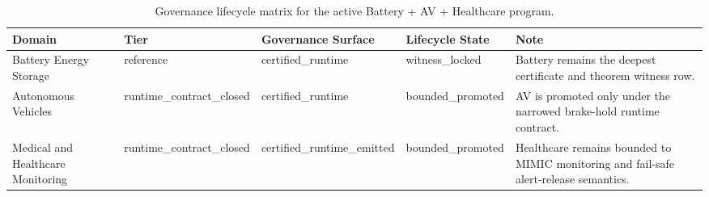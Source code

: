 \begin{table}[htbp]
\centering
\caption{Governance lifecycle matrix for the active Battery + AV + Healthcare program.}
\label{tbl:orius-governance-lifecycle-matrix}
\begin{tabular}{lllll}
\toprule
Domain & Tier & Governance Surface & Lifecycle State & Note\\
\midrule
Battery Energy Storage & reference & certified\_runtime & witness\_locked & Battery remains the deepest certificate and theorem witness row.\\
Autonomous Vehicles & runtime\_contract\_closed & certified\_runtime & bounded\_promoted & AV is promoted only under the narrowed brake-hold runtime contract.\\
Medical and Healthcare Monitoring & runtime\_contract\_closed & certified\_runtime\_emitted & bounded\_promoted & Healthcare remains bounded to MIMIC monitoring and fail-safe alert-release semantics.\\
\bottomrule
\end{tabular}
\end{table}
